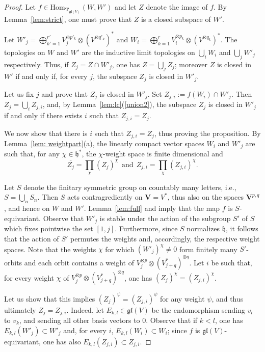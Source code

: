\documentclass[12pt,reqno]{amsart}
\newcommand{\Hom}{\mathrm{Hom}}
\theoremstyle{definition}
\theoremstyle{remark}
\begin{document}
	\begin{proof}
	Let $f\in\Hom_{\mathbf{T}_{\mathfrak{gl}(V)}}(W, W')$ and let $Z$ denote the image of $f$. By Lemma~\ref{lem:strict}, one must prove that $Z$ is a closed subspace of $W'$. 
	
	Let $W'_j = \bigoplus_{k'=1}^{r'} V_j ^{\otimes p'_k}\otimes (V^{\otimes q'_k})^*$ and $W_i = \bigoplus_{k=1}^r V_i ^{\otimes p_k}\otimes (V^{\otimes q_k})^*$. The topologies on $W$ and $W'$ are the inductive limit topologies on $\bigcup_i W_i$ and $\bigcup_j W'_j$ respectively. Thus, if $Z_j = Z \cap W'_j$, one has $Z = \bigcup_j Z_j$; moreover $Z$ is closed in $W'$ if and only if, for every $j$, the subspace $Z_j$ is closed in $W'_j$.
	
	Let us fix $j$ and prove that $Z_j$ is closed in $W'_j$. Set $Z_{j, i}:=f(W_i)\cap W'_j$. Then $Z_j = \bigcup_i Z_{j, i}$, and, by Lemma~\ref{lem:lc}(\ref{union2}), the subspace $Z_j$ is closed in $W'_j$ if and only if there exists $i$ such that $Z_{j, i} = Z_j$.
	
	We now show that there is $i$ such that $Z_{j, i} = Z_j$, thus proving the proposition. By Lemma~\ref{lem: weightpart}(a), the linearly compact vector spaces $W_i$ and $W'_j$ are such that, for any $\chi\in\mathfrak{h}^\ast$, the $\chi$-weight space is finite dimensional and
	$$
	\overline{Z_j}= \prod_\chi (Z_j)^\chi  \ \ \mathrm{and} \ \ Z_{j, i} =\prod_\chi (Z_{j, i})^\chi.
	$$
	
	Let $S$ denote the finitary symmetric group on countably many letters, i.e., $S=\bigcup_n S_n$.
	Then $S$ acts contragrediently on $\mathbf{V} = V^\ast$, thus also on the spaces $\mathbf{V}^{p, q}$, and hence on $W$ and $W'$. Lemma~\ref{lem:full} and \cite[Lemma 6.1]{DPS} imply that the map $f$ is $S$-equivariant. Observe that $W'_j$ is stable under the action of the subgroup $S'$ of $S$ which  fixes pointwise the set $[1,j]$. Furthermore, since $S$ normalizes $\mathfrak{h}$, it follows that the action of $S'$ permutes the weights and, accordingly, the respective weight spaces. Note that the weights $\chi$ for which $(W'_j)^{\chi}\neq 0$ form finitely many $S'$-orbits and each orbit contains a weight of $V_j ^{\otimes p}\otimes (V_{j+q}^{\ast})^{\otimes q}$. Let $i$ be such that, for every weight $\chi$ of 
	$V_j ^{\otimes p}\otimes (V_{j+q}^{\ast})^{\otimes q}$, one has $(Z_j)^\chi = (Z_{j, i})^\chi$.
	
	Let us show that this implies $(Z_j)^\psi = (Z_{j, i})^\psi$ for any weight $\psi$, and thus ultimately $Z_j = Z_{j, i}$. Indeed, let $E_{k,l}\in\mathfrak{gl}(V)$ be the endomorphism sending $v_l$ to $v_k$, and sending all other basis vectors to $0$. Observe that if $k<l$, one has $E_{k,l}(W'_j)\subset W'_j$ and, for every $i$, $E_{k,l}(W_i)\subset W_i$; since $f$ is $\mathfrak{gl}(V)$-equivariant, one has also $E_{k,l}(Z_{j,i})\subset Z_{j,i}$.
	

\end{proof}
\end{document}
